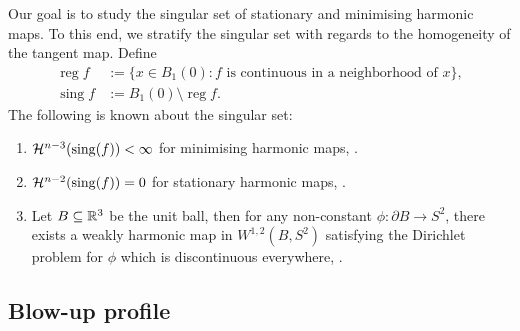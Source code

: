 Our goal is to study the singular set of stationary and minimising harmonic maps. To this end, we stratify the singular set with regards to the homogeneity of the tangent map. Define
	\begin{align*}
		\operatorname{reg} f 
			&:= \{ x \in B_1 (0) : \text{$f$ is continuous in a neighborhood of $x$} \},\\
		 \operatorname{sing} f 
		 	&:= B_1 (0) \setminus \operatorname{reg} f.
	\end{align*}
The following is known about the singular set:
\begin{enumerate}
	\item $\mathcal H^{n - 3} (\mathrm{sing} (f)) < \infty$ for minimising harmonic maps, \cite{SchoenUhlenbeck1982}. 
	\item $\mathcal H^{n - 2} (\mathrm{sing} (f)) = 0$ for stationary harmonic maps, \cite{Bethuel1993,Lin1999}. 
	\item Let $B \subseteq \mathbb R^3$ be the unit ball, then for any non-constant $\phi : \partial B \to S^2$, there exists a weakly harmonic map in $W^{1, 2} (B, S^2)$ satisfying the Dirichlet problem for $\phi$ which is discontinuous everywhere, \cite{Riviere1995}.
\end{enumerate}


\subsection{Blow-up profile}

